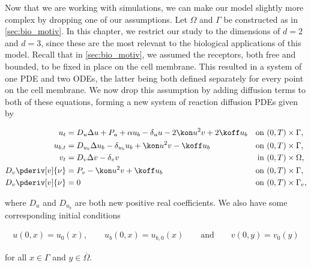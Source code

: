 Now that we are working with simulations, we can make our model slightly more complex by dropping one of our assumptions. Let $\Omega$ and $\Gamma$ be constructed as in \cref{sec:bio_motiv}. In this chapter, we restrict our study to the dimensions of $d = 2$ and $d = 3$, since these are the most relevant to the biological applications of this model. Recall that in \cref{sec:bio_motiv}, we assumed the receptors, both free and bounded, to be fixed in place on the cell membrane. This resulted in a system of one PDE and two ODEs, the latter being both defined separately for every point on the cell membrane. We now drop this assumption by adding diffusion terms to both of these equations, forming a new system of reaction diffusion PDEs given by

\begin{equation}
\label{eq:expanded_pdes}
\begin{aligned}
    u_t &= D_u \Delta u + P_u + \alpha u_b - \delta_u u - 2 \kon u^2 v + 2 \koff u_b & \text{on } &(0, T) \times \Gamma, \\
    u_{b,t} &= D_{u_b} \Delta u_b - \delta_{u_b} u_b + \kon u^2 v - \koff u_b & \text{on } &(0, T) \times \Gamma, \\
    v_t &= D_v \Delta v - \delta_v v & \text{in } &(0, T) \times \Omega, \\
    D_v \pderiv[v]{\nu} &= P_v - \kon u^2 v + \koff u_b & \text{on } &(0, T) \times \Gamma, \\
    D_v \pderiv[v]{\nu} &= 0 & \text{on } &(0, T) \times \Gamma_e, \\
\end{aligned}
\end{equation}

\noindent
where $D_u$ and $D_{u_b}$ are both new positive real coefficients. We also have some corresponding initial conditions

\begin{equation*}
\begin{aligned}
    u(0, x) = u_0(x), \qquad u_b(0, x) = u_{b,0}(x) \qquad \text{and} \qquad v(0, y) = v_0(y)
\end{aligned}
\end{equation*}

\noindent
for all $x \in \Gamma$ and $y \in \overline{\Omega}$.

